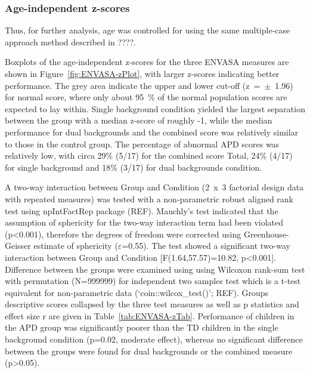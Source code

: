 \documentclass[a4paper, twoside]{templates/ociamthesis}
\begin{document}
\hypertarget{age-independent-z-scores-2}{%
\subsubsection*{Age-independent z-scores}\label{age-independent-z-scores-2}}

Thus, for further analysis, age was controlled for using the same multiple-case approach method described in ????.

Boxplots of the age-independent z-scores for the three ENVASA measures are shown in Figure~\ref{fig:ENVASA-zPlot}, with larger z-scores indicating better performance. The grey area indicate the upper and lower cut-off (z~=~\(\pm\)~1.96) for normal score, where only about 95~\% of the normal population scores are expected to lay within. Single background condition yielded the largest separation between the group with a median z-score of roughly -1, while the median performance for dual backgrounds and the combined score was relatively similar to those in the control group. The percentage of abnormal APD scores was relatively low, with circa 29\% (5/17) for the combined score Total, 24\% (4/17) for single background and 18\% (3/17) for dual backgrounds condition.

A two-way interaction between Group and Condition (2~x~3 factorial design data with repeated measures) was tested with a non-parametric robust aligned rank test using npIntFactRep package (REF). Mauchly's test indicated that the assumption of sphericity for the two-way interaction term had been violated (p\textless0.001), therefore the degrees of freedom were corrected using Greenhouse-Geisser estimate of sphericity (\(\varepsilon\)=0.55). The test showed a significant two-way interaction between Group and Condition {[}F(1.64,57.57)=10.82, p\textless0.001{]}. Difference between the groups were examined using using Wilcoxon rank-sum test with permutation (N=999999) for independent two samples test which is a t-test equivalent for non-parametric data (`coin::wilcox\_test()'; REF). Groups descriptive scores collapsed by the three test measures as well as p statistics and effect size r are given in Table~\ref{tab:ENVASA-zTab}. Performance of children in the APD group was significantly poorer than the TD children in the single background condition (p=0.02, moderate effect), whereas no significant difference between the groups were found for dual backgrounds or the combined measure (p\textgreater0.05).
\end{document}
